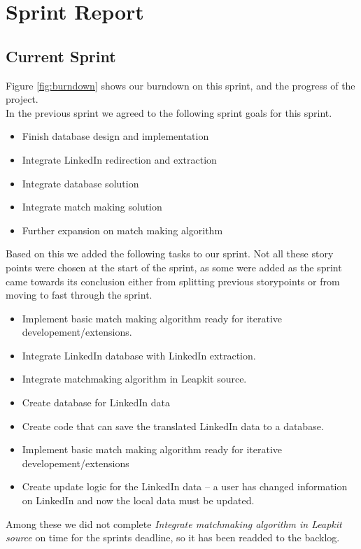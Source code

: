 \section{Sprint Report}

\subsection{Current Sprint}
Figure \ref{fig:burndown} shows our burndown on this sprint, and the progress of the project.\\
In the previous sprint we agreed to the following sprint goals for this sprint. 
\begin{itemize}
    \item Finish database design and implementation
    \item Integrate LinkedIn redirection and extraction
    \item Integrate database solution
    \item Integrate match making solution
    \item Further expansion on match making algorithm
\end{itemize}
Based on this we added the following tasks to our sprint. Not all these story points were chosen at the start of the 
sprint, as some were added as the sprint came towards its conclusion either from splitting previous storypoints or 
from moving to fast through the sprint.
\begin{itemize}
    \item Implement basic match making algorithm ready for iterative developement/extensions.
    \item Integrate LinkedIn database with LinkedIn extraction. 
    \item Integrate matchmaking algorithm in Leapkit source.
    \item Create database for LinkedIn data
    \item Create code that can save the translated LinkedIn data to a database.
    \item Implement basic match making algorithm ready for iterative developement/extensions 
    \item Create update logic for the LinkedIn data -- a user has changed information on LinkedIn and now the local data must be updated.
\end{itemize}
Among these we did not complete \emph{Integrate matchmaking algorithm in Leapkit source} on time for the sprints deadline, so it has been readded to the backlog.
